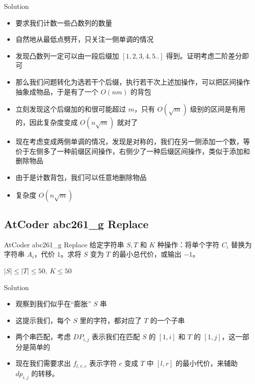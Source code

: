 ﻿\documentclass[aspectratio=169]{ctexbeamer}
\begin{document}
\begin{frame}{Solution}
    \begin{itemize}
        \item 要求我们计数一些凸数列的数量
        \item 自然地从最低点劈开，只关注一侧单调的情况
        \item 发现凸数列一定可以由一段后缀加 $[1,2,3,4,5..]$ 得到。证明考虑二阶差分即可
        \item 那么我们问题转化为选若干个后缀，执行若干次上述加操作，可以把区间操作抽象成物品，于是有了一个 $O(nm)$ 的背包
        \item 立刻发现这个后缀加的和很可能超过 $m$，只有 $O(\sqrt{m})$ 级别的区间是有用的，因此复杂度变成 $O(n\sqrt{m})$ 就对了
        \item 现在考虑变成两侧单调的情况，发现是对称的，我们在另一侧添加一个数，等价于左侧多了一种前缀区间操作，右侧少了一种后缀区间操作，类似于添加和删除物品
        \item 由于是计数背包，我们可以任意地删除物品
        \item 复杂度 $O(n\sqrt{m})$
    \end{itemize}
\end{frame}

\subsection{AtCoder abc261\_g Replace}
\begin{frame}{AtCoder abc261\_g Replace}
    给定字符串 $S,T$ 和 $K$ 种操作：将单个字符 $C_i$ 替换为字符串 $A_i$，代价 $1$。求将 $S$ 变为 $T$ 的最小总代价，或输出 $-1$。
    
    $|S|\le|T|\le 50,\ K\le 50$
\end{frame}

\begin{frame}{Solution}
    \begin{itemize}
        \item 观察到我们似乎在“膨胀” $S$ 串
        \item 这提示我们，每个 $S$ 里的字符，都对应了 $T$ 的一个子串
        \item 两个串匹配，考虑 $DP_{i,j}$ 表示我们在匹配 $S$ 的 $[1,i]$ 和 $T$ 的 $[1,j]$，这一部分是简单的
        \item 现在我们需要求出 $f_{l,r,c}$ 表示字符 $c$ 变成 $T$ 中 $[l,r]$ 的最小代价，来辅助 $dp_{i,j}$ 的转移。
    \end{itemize}
\end{frame}
\end{document}
